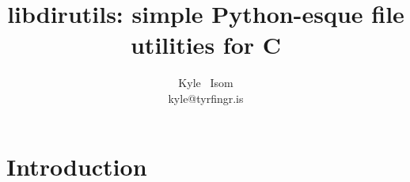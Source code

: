 \documentclass[10pt,letterpaper]{article}
\title{libdirutils: simple Python-esque file utilities for C}\author{Kyle ~Isom\\kyle@tyrfingr.is}
\begin{document}
\maketitle
\section*{Introduction}
\end{document}
